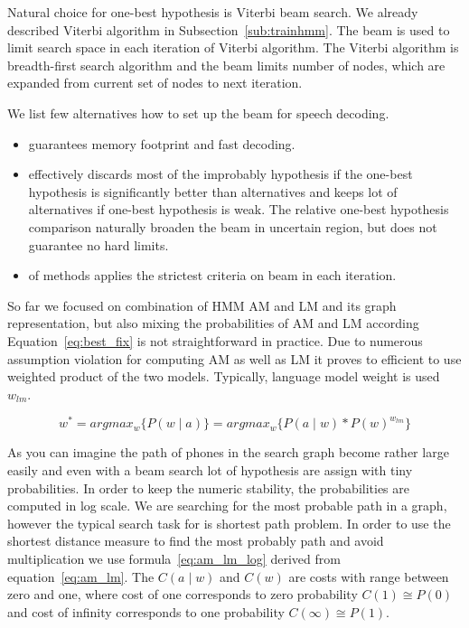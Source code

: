 {Natural choice for one-best hypothesis is Viterbi beam search.\cite{huang2001spoken}
We already described Viterbi algorithm in Subsection~\ref{sub:trainhmm}.
The beam is used to limit search space in each iteration of Viterbi algorithm.
The Viterbi algorithm is breadth-first search algorithm and the beam limits 
number of nodes, which are expanded from current set of nodes to next iteration.


We list few alternatives how to set up the beam for speech decoding.
\begin{itemize}
    \item {} guarantees memory footprint and fast decoding.
    \item {} effectively discards 
        most of the improbably hypothesis if the one-best hypothesis is significantly better than alternatives
        and keeps lot of alternatives if one-best hypothesis is weak.
        The relative one-best hypothesis comparison naturally broaden the beam in uncertain region,
        but does not guarantee no hard limits.
    \item {} of methods applies the strictest criteria on beam in each iteration.
\end{itemize}


So far we focused on combination of \ac{HMM} \ac{AM} and \ac{LM} and its graph representation,
but also mixing the probabilities of \ac{AM} and \ac{LM} according Equation~\ref{eq:best_fix}
is not straightforward in practice. Due to numerous assumption violation for computing 
\ac{AM} as well as \ac{LM} it proves to efficient to use weighted product of the two models.
Typically, language model weight is used $w_{lm}$.

\begin{equation}\label{eq:am_lm}
    w^* = argmax_{w}\{P(w \mid a)\} = argmax_{w}\{P(a \mid w) * P(w)^{w_{lm}}\}
\end{equation}

As you can imagine the path of phones in the search graph 
become rather large easily and even with a beam search lot of hypothesis
are assign with tiny probabilities.
In order to keep the numeric stability, the probabilities 
are computed in log scale. We are searching for the most probable path in a graph,
however the typical search task for is shortest path problem.
In order to use the shortest distance measure to find the most probably path
and avoid multiplication we use formula~\ref{eq:am_lm_log} derived from equation~\ref{eq:am_lm}.
The $C(a \mid w)$ and $C(w)$ are costs with range between zero and one,
where cost of one corresponds to zero probability $C(1) \cong P(0)$ 
and cost of infinity corresponds to one probability $C(\infty) \cong P(1)$.

}
